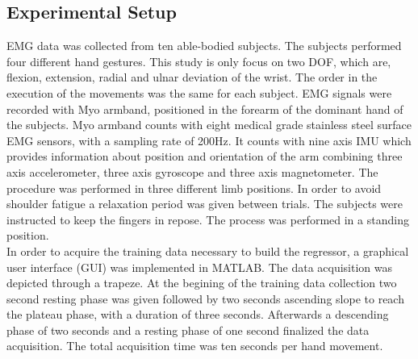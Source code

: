 \subsection{Experimental Setup}
EMG data was collected from ten able-bodied subjects. The subjects performed four different hand gestures. This study is only focus on two DOF, which are, flexion, extension, radial and ulnar deviation of the wrist. The order in the execution of the movements was the same for each subject. EMG signals were recorded with Myo armband, positioned in the forearm of the dominant hand of the subjects. Myo armband counts with eight medical grade stainless steel surface EMG sensors, with a sampling rate of 200Hz. It counts with nine axis IMU which provides information about position and orientation of the arm combining three axis accelerometer, three axis gyroscope and three axis magnetometer. %
The procedure was performed in three different limb positions. In order to avoid shoulder fatigue a relaxation period was given between trials. The subjects were instructed to keep the fingers in repose. %
The process was performed in a standing position. \\ %
 
 In order to acquire the training data necessary to build the regressor, a graphical user interface (GUI) was implemented in MATLAB. %
 The data acquisition was depicted through a trapeze. %
 At the begining of the training data collection two second resting phase was given followed by two seconds ascending slope to reach the plateau phase, with a duration of three seconds. Afterwards a descending phase of two seconds and a resting phase of one second finalized the data acquisition. The total acquisition time was ten seconds per hand movement.

